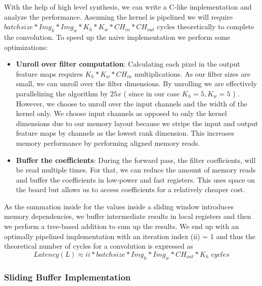 With the help of high level synthesis, we can write a C-like implementation and analyze the performance. Assuming the kernel is pipelined we will require $ batch size * Img_h * Img_w * K_h * K_w * CH_{in} * CH_{out}  $ cycles theoretically to complete the convolution. To speed up the naive implementation we perform some optimizations:

\begin{itemize}
\item
\textbf{Unroll over filter computation}: Calculating each pixel in the output feature maps requires $ K_h * K_w * CH_{in} $ multiplications. As our filter sizes are small, we can unroll over the filter dimensions. By unrolling we are effectively parallelizing the algorithm by $ \mathit{25x} $ ( since in our case $ K_h = 5, K_w=5 $ ) . However, we choose to unroll over the input channels and the width of the kernel only. We choose input channels as opposed to only the kernel dimensions due to our memory layout because we stripe the input and  output feature maps by channels as the lowest rank dimension. This increases memory performance by performing aligned memory reads. 

\item
\textbf{Buffer the coefficients}: During the forward pass, the filter coefficients, will be read multiple times.  For that, we can reduce the amount of memory reads and buffer the coefficients in low-power and fast registers. This uses space on the board but allows us to access coefficients for a relatively cheaper cost.
\end{itemize}

As the summation inside for the values inside a sliding window introduces memory dependencies, we buffer intermediate results in local registers and then we perform a tree-based addition to sum up the results. We end up with an  optimally pipelined implementation with an iteration index (ii) = 1 and thus the theoretical number of cycles for a convolution is expressed as 
\begin{equation}
Latency (L)  \approx ii * batch size * Img_h * Img_w * CH_{out} * K_h  \; cycles
\end{equation}

\newpage




\subsubsection{Sliding Buffer Implementation} \label{slidingimpl}


